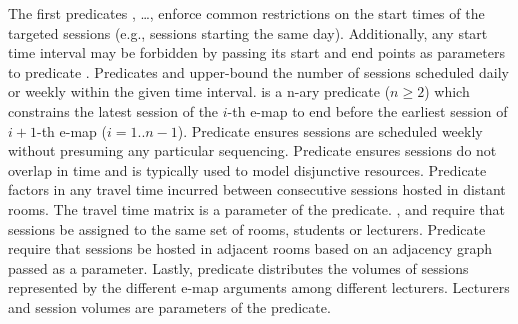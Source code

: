 The first predicates 
\texttt{\SAMEDAILYSLOT},
\ldots,
\texttt{\SAMESLOT}
enforce common restrictions on the start times of the targeted sessions (e.g., sessions starting the same day).
Additionally,
any start time interval may be forbidden 
by passing its start and end points 
as parameters to 
predicate \texttt{\FORBIDDENPERIOD}.
Predicates \texttt{\ATMOSTDAILY}
and
\texttt{\ATMOSTWEEKLY}
upper-bound
the number of sessions
scheduled daily or weekly
within the given time interval.
\texttt{\SEQUENCED}
is a n-ary predicate ($n\geq2$)
which constrains
the latest session of the $i$-th e-map 
to end before
the earliest session of $i+1$-th e-map ($i=1..n-1$).
Predicate 
\texttt{\WEEKLY}
ensures sessions
are scheduled weekly
without presuming any particular sequencing.
Predicate
\texttt{\NOOVERLAP}
ensures sessions do not overlap in time
and is typically used to model disjunctive resources.
Predicate \texttt{\TRAVEL}
factors in any travel time
incurred between consecutive sessions
hosted in distant rooms.
The travel time matrix is a parameter of the predicate.
\texttt{\SAMEROOMS},
\texttt{\SAMESTUDENTS}
and
\texttt{\SAMETEACHERS}
require that sessions be assigned to the same set of rooms,
students or lecturers.
Predicate 
\texttt{\ADJACENTROOMS}
require that sessions be hosted in 
adjacent rooms 
based on an adjacency graph passed as a parameter.
Lastly, 
predicate \texttt{\TEACHERDISTRIBUTION}
distributes the volumes of sessions represented by the different e-map arguments 
among different lecturers. Lecturers and session volumes are parameters of the predicate.

